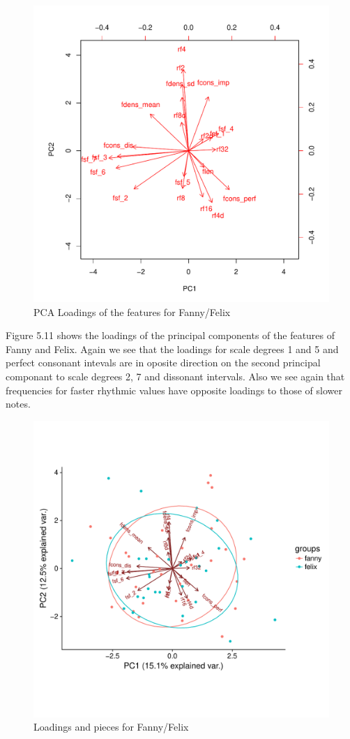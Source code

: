 \documentclass[12pt,twoside]{reedthesis}
\theoremstyle{definition}
\theoremstyle{definition}
\theoremstyle{definition}
\theoremstyle{remark}
\begin{document}
\begin{figure}[h]
\centering
\includegraphics[scale = .5]{images/biplot_f.pdf}
\caption{PCA Loadings of the features for Fanny/Felix}
\label{subd}
\end{figure}
Figure 5.11 shows the loadings of the principal components of the
features of Fanny and Felix. Again we see that the loadings for scale
degrees 1 and 5 and perfect consonant intevals are in oposite direction
on the second principal componant to scale degrees 2, 7 and dissonant
intervals. Also we see again that frequencies for faster rhythmic values
have opposite loadings to those of slower notes.
\begin{figure}[H]
\centering
\includegraphics[scale = .5]{images/bi_elipse_12_f.pdf}
\caption{Loadings and pieces for Fanny/Felix}
\label{subd}
\end{figure}
\end{document}
